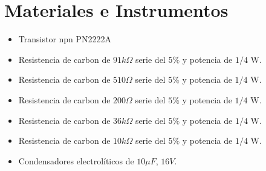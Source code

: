 \documentclass[10pt, a4paper]{article}
\begin{document}
    \section{Materiales e Instrumentos}


    \begin{itemize}
        \item Transistor npn PN2222A
        \item Resistencia de carbon de $91k\Omega$  serie del $5\%$ y potencia de $1/4$ W.
        \item Resistencia de carbon de $510\Omega$  serie del $5\%$ y potencia de $1/4$ W.
        \item Resistencia de carbon de $200\Omega$  serie del $5\%$ y potencia de $1/4$ W.
        \item Resistencia de carbon de $36k\Omega$  serie del $5\%$ y potencia de $1/4$ W.
        \item Resistencia de carbon de $10k\Omega$  serie del $5\%$ y potencia de $1/4$ W.
        \item Condensadores electrolíticos de $10\mu F$, $16 V$.
    \end{itemize}
\end{document}
